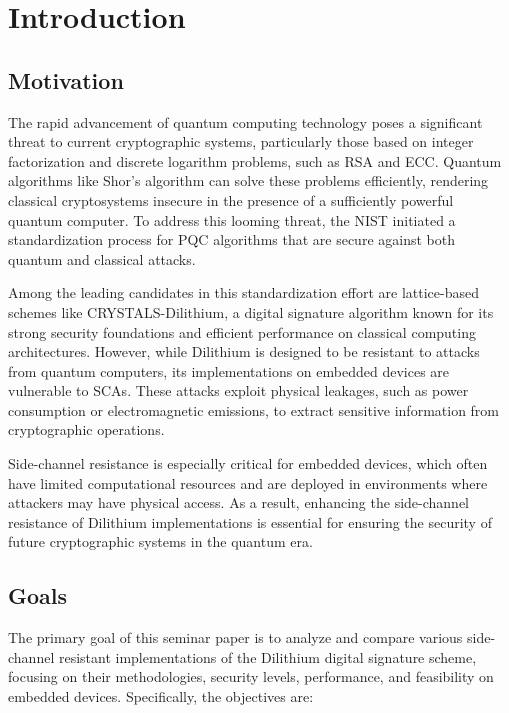 
\chapter{Introduction}
\thispagestyle{chapterstart}

\section{Motivation}

The rapid advancement of quantum computing technology poses a significant threat to current cryptographic systems, particularly those based on integer factorization and discrete logarithm problems, such as RSA and \ac{ECC}. Quantum algorithms like Shor's algorithm can solve these problems efficiently, rendering classical cryptosystems insecure in the presence of a sufficiently powerful quantum computer. To address this looming threat, the \ac{NIST} initiated a standardization process for \ac{PQC} algorithms that are secure against both quantum and classical attacks.

Among the leading candidates in this standardization effort are lattice-based schemes like CRYSTALS-Dilithium, a digital signature algorithm known for its strong security foundations and efficient performance on classical computing architectures. However, while Dilithium is designed to be resistant to attacks from quantum computers, its implementations on embedded devices are vulnerable to \acp{SCA}. These attacks exploit physical leakages, such as power consumption or electromagnetic emissions, to extract sensitive information from cryptographic operations.

Side-channel resistance is especially critical for embedded devices, which often have limited computational resources and are deployed in environments where attackers may have physical access. As a result, enhancing the side-channel resistance of Dilithium implementations is essential for ensuring the security of future cryptographic systems in the quantum era.

\section{Goals}

The primary goal of this seminar paper is to analyze and compare various side-channel resistant implementations of the Dilithium digital signature scheme, focusing on their methodologies, security levels, performance, and feasibility on embedded devices. Specifically, the objectives are:


